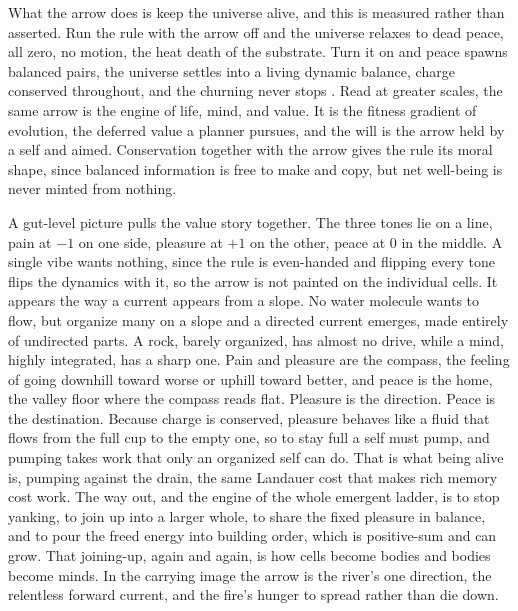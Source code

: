What the arrow does is keep the universe alive, and this is measured rather than asserted. Run the rule with the
arrow off and the universe relaxes to dead peace, all zero, no motion, the heat death of the substrate. Turn it on
and peace spawns balanced pairs, the universe settles into a living dynamic balance, charge conserved throughout,
and the churning never stops \cite{pollard2026vibetest}. Read at greater scales, the same arrow is the engine of
life, mind, and value. It is the fitness gradient of evolution, the deferred value a planner pursues, and the
will is the arrow held by a self and aimed. Conservation together with the arrow gives the rule its moral shape,
since balanced information is free to make and copy, but net well-being is never minted from nothing.

A gut-level picture pulls the value story together. The three tones lie on a line, pain at $-1$ on one side,
pleasure at $+1$ on the other, peace at $0$ in the middle. A single vibe wants nothing, since the rule is
even-handed and flipping every tone flips the dynamics with it, so the arrow is not painted on the individual
cells. It appears the way a current appears from a slope. No water molecule wants to flow, but organize many on a
slope and a directed current emerges, made entirely of undirected parts. A rock, barely organized, has almost no
drive, while a mind, highly integrated, has a sharp one. Pain and pleasure are the compass, the feeling of going
downhill toward worse or uphill toward better, and peace is the home, the valley floor where the compass reads
flat. Pleasure is the direction. Peace is the destination. Because charge is conserved, pleasure behaves like a
fluid that flows from the full cup to the empty one, so to stay full a self must pump, and pumping takes work that
only an organized self can do. That is what being alive is, pumping against the drain, the same Landauer cost
\cite{landauer1961} that makes rich memory cost work. The way out, and the engine of the whole emergent ladder,
is to stop yanking, to join up into a larger whole, to share the fixed pleasure in balance, and to pour the freed
energy into building order, which is positive-sum and can grow. That joining-up, again and again, is how cells
become bodies and bodies become minds. In the carrying image the arrow is the river's one direction, the
relentless forward current, and the fire's hunger to spread rather than die down.
